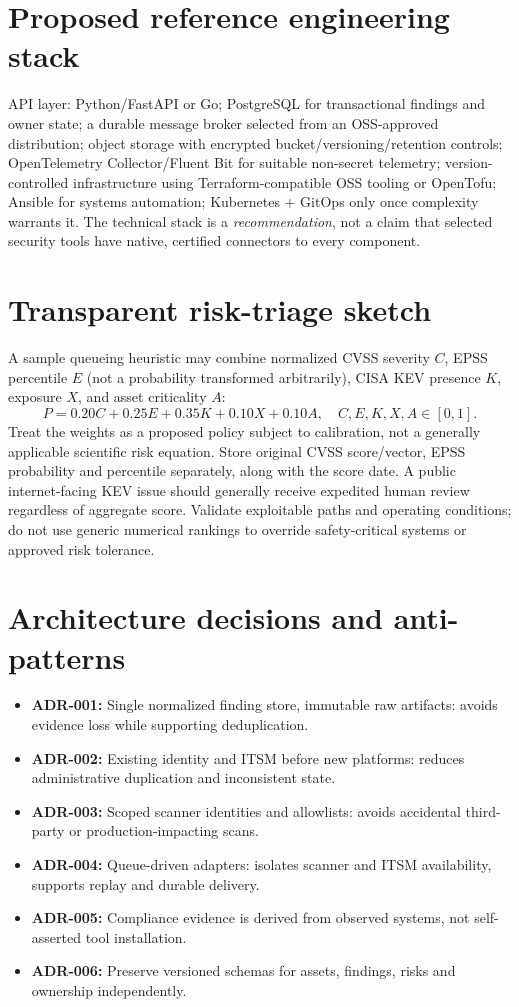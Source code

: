 \documentclass[11pt,oneside]{report}
\begin{document}
\section{Proposed reference engineering stack}
API layer: Python/FastAPI or Go; PostgreSQL for transactional findings and owner state; a durable message broker selected from an OSS-approved distribution; object storage with encrypted bucket/versioning/retention controls; OpenTelemetry Collector/Fluent Bit for suitable non-secret telemetry; version-controlled infrastructure using Terraform-compatible OSS tooling or OpenTofu; Ansible for systems automation; Kubernetes + GitOps only once complexity warrants it. The technical stack is a \emph{recommendation}, not a claim that selected security tools have native, certified connectors to every component.

\section{Transparent risk-triage sketch}
A sample queueing heuristic may combine normalized CVSS severity $C$, EPSS percentile $E$ (not a probability transformed arbitrarily), CISA KEV presence $K$, exposure $X$, and asset criticality $A$:
\[
P = 0.20 C + 0.25 E + 0.35 K + 0.10 X + 0.10 A,
\quad C,E,K,X,A \in [0,1].
\]
Treat the weights as a proposed policy subject to calibration, not a generally applicable scientific risk equation. Store original CVSS score/vector, EPSS probability and percentile separately, along with the score date. A public internet-facing KEV issue should generally receive expedited human review regardless of aggregate score. Validate exploitable paths and operating conditions; do not use generic numerical rankings to override safety-critical systems or approved risk tolerance.

\section{Architecture decisions and anti-patterns}
\begin{itemize}[leftmargin=1.4em]
\item \textbf{ADR-001:} Single normalized finding store, immutable raw artifacts: avoids evidence loss while supporting deduplication.
\item \textbf{ADR-002:} Existing identity and ITSM before new platforms: reduces administrative duplication and inconsistent state.
\item \textbf{ADR-003:} Scoped scanner identities and allowlists: avoids accidental third-party or production-impacting scans.
\item \textbf{ADR-004:} Queue-driven adapters: isolates scanner and ITSM availability, supports replay and durable delivery.
\item \textbf{ADR-005:} Compliance evidence is derived from observed systems, not self-asserted tool installation.
\item \textbf{ADR-006:} Preserve versioned schemas for assets, findings, risks and ownership independently.
\end{itemize}
\end{document}
